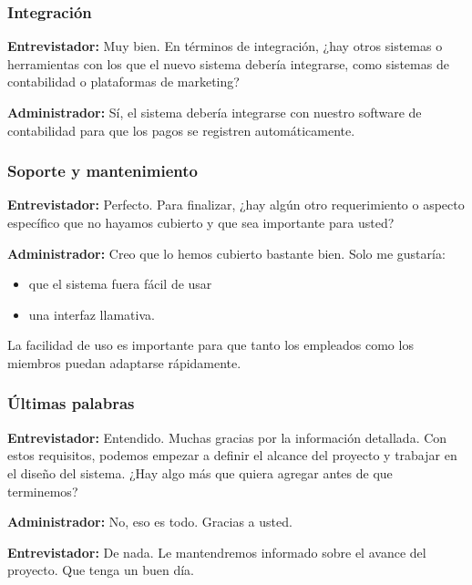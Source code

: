 \documentclass[spanish, 12pt]{article}
\providecommand{\tightlist}{\setlength{\itemsep}{0pt}
\setlength{\parskip}{0pt}}
\begin{document}
	\subsubsection{Integración}
	\label{integraciuxf3n}

	\textbf{Entrevistador:} Muy bien. En términos de integración, ¿hay otros
	sistemas o herramientas con los que el nuevo sistema debería integrarse, como sistemas
	de contabilidad o plataformas de marketing?

	\textbf{Administrador:} Sí, el sistema debería integrarse con nuestro software
	de contabilidad para que los pagos se registren automáticamente.

	\subsubsection{Soporte y mantenimiento}
	\label{soporte-y-mantenimiento}

	\textbf{Entrevistador:} Perfecto. Para finalizar, ¿hay algún otro requerimiento
	o aspecto específico que no hayamos cubierto y que sea importante para usted?

	\textbf{Administrador:} Creo que lo hemos cubierto bastante bien. Solo me gustaría:

	\begin{itemize}
		\tightlist

		\item que el sistema fuera fácil de usar

		\item una interfaz llamativa.
	\end{itemize}

	La facilidad de uso es importante para que tanto los empleados como los
	miembros puedan adaptarse rápidamente.

	\subsubsection{Últimas palabras}
	\label{uxfaltimas-palabras}

	\textbf{Entrevistador:} Entendido. Muchas gracias por la información detallada.
	Con estos requisitos, podemos empezar a definir el alcance del proyecto y trabajar
	en el diseño del sistema. ¿Hay algo más que quiera agregar antes de que
	terminemos?

	\textbf{Administrador:} No, eso es todo. Gracias a usted.

	\textbf{Entrevistador:} De nada. Le mantendremos informado sobre el avance del
	proyecto. Que tenga un buen día.
\end{document}
